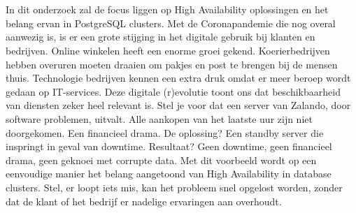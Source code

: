 \chapter{}
\label{ch:inleiding}



\section{}
\label{sec:probleemstelling}

In dit onderzoek zal de focus liggen op High Availability oplossingen en het belang ervan in PostgreSQL clusters. Met de Coronapandemie die nog overal aanwezig is, is er een grote stijging in het digitale gebruik bij klanten en bedrijven. Online winkelen heeft een enorme groei gekend. Koerierbedrijven hebben overuren moeten draaien om pakjes en post te brengen bij de mensen thuis. Technologie bedrijven kennen een extra druk omdat er meer beroep wordt gedaan op IT-services. Deze digitale (r)evolutie toont ons dat beschikbaarheid van diensten zeker heel relevant is. Stel je voor dat een server van Zalando, door software problemen, uitvalt. Alle aankopen van het laatste uur zijn niet doorgekomen. Een financieel drama. De oplossing? Een standby server die inspringt in geval van downtime. Resultaat? Geen downtime, geen financieel drama, geen geknoei met corrupte data. Met dit voorbeeld wordt op een eenvoudige manier het belang aangetoond van High Availability in database clusters. Stel, er loopt iets mis, kan het probleem snel opgelost worden, zonder dat de klant of het bedrijf er nadelige ervaringen aan overhoudt.

